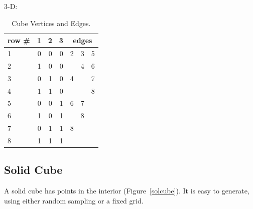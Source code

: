 \documentclass[a4paper]{report}
\begin{document}
\begin{article}
\begin{table}[htp]
\bigskip

3-D:
\bigskip

\begin{tabular}{|l ||r|r|r|| r r r|}
\hline
row \# & 1 & 2 & 3 & \multicolumn{3}{c|}{edges} \\
\hline
1 & 0 & 0& 0 & 2 & 3 & 5\\
\hline
2 & 1 & 0 & 0 & & 4 & 6\\
\hline
3 & 0 & 1 & 0 & 4 & & 7\\
\hline
4 & 1 & 1 & 0 & & & 8\\
\hline
5 & 0 & 0 & 1 & 6 & 7 & \\
\hline
6 & 1 & 0 & 1 & & 8 & \\
\hline
7 & 0 & 1 & 1 & 8 & & \\
\hline
8 & 1 & 1 & 1 & & & \\
\hline
\end{tabular}
\caption{Cube Vertices and Edges.}
\label{verticetable}
\end{table}

\subsection{Solid Cube}

A solid cube has points in the interior (Figure~\ref{solcube}). It is
easy to generate, using either random sampling or a fixed grid.


\end{article}
\end{document}
